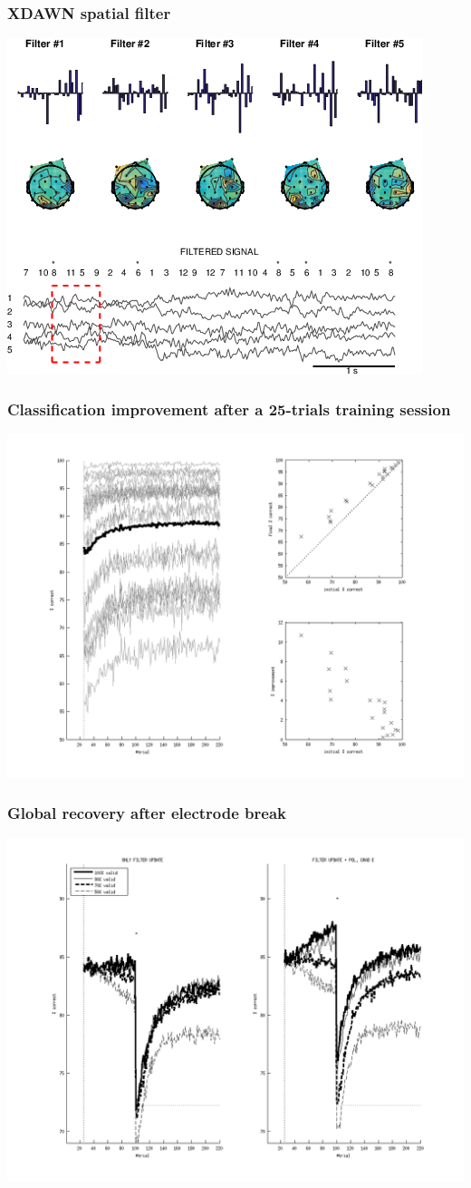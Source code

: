 \documentclass{beamer}
\begin{document}
\begin{frame}\frametitle{XDAWN spatial filter}
	\vspace{-.8cm}
	\cite{Rivet09}
	\centerline{
		\includegraphics[width=0.7\linewidth]{ijcnn-eeg-filt}
	}
\end{frame}

\begin{frame}\frametitle{Classification improvement after a 25-trials training session}
\centerline{
	\includegraphics[width=.9\linewidth]{fig_filter_adapt}
}
\end{frame}

\begin{frame}\frametitle{Global recovery after electrode break
		}
	\centerline{
		\includegraphics[width=0.9\linewidth]{fig_invalid}
	}
\end{frame}
\end{document}
